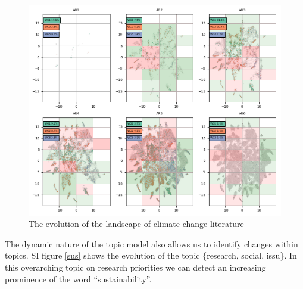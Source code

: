 \documentclass{article}
\begin{document}
\begin{linenumbers}
\begin{figure}
	\begin{center}
		\includegraphics[width=1\linewidth]{tsne_results/plots/run_665_s_0_p200_evolution.png}
		\caption{The evolution of the landscape of climate change literature}
		\label{map-growth}
	\end{center}
\end{figure}



%


The dynamic nature of the topic model also allows us to identify changes within topics. SI figure \ref{sus} shows the evolution of the topic \{research, social, issu\}. In this overarching topic on research priorities we can detect an increasing prominence of the word ``sustainability''.


\end{linenumbers}
\end{document}

